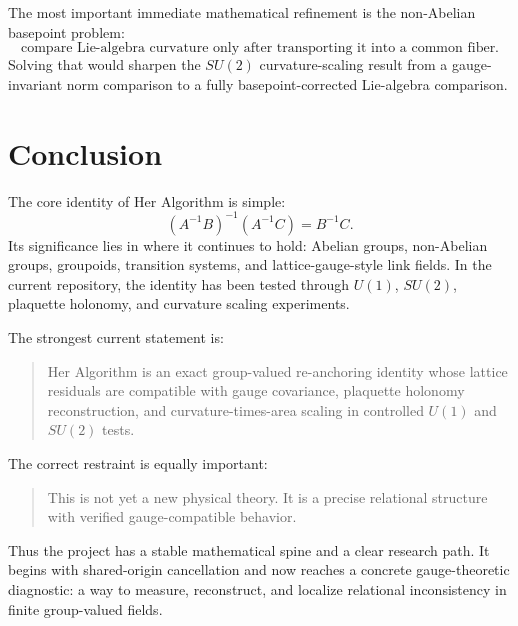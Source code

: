 \documentclass[11pt]{article}
\newcommand{\HA}{Her Algorithm}
\newcommand{\Uone}{U(1)}
\newcommand{\Sutwo}{SU(2)}
\begin{document}
The most important immediate mathematical refinement is the non-Abelian basepoint problem:
\[
\boxed{\text{compare Lie-algebra curvature only after transporting it into a common fiber.}}
\]
Solving that would sharpen the \(\Sutwo\) curvature-scaling result from a gauge-invariant norm comparison to a fully basepoint-corrected Lie-algebra comparison.

\section{Conclusion}

The core identity of \HA{} is simple:
\[
(A^{-1}B)^{-1}(A^{-1}C)=B^{-1}C.
\]
Its significance lies in where it continues to hold: Abelian groups, non-Abelian groups, groupoids, transition systems, and lattice-gauge-style link fields.  In the current repository, the identity has been tested through \(\Uone\), \(\Sutwo\), plaquette holonomy, and curvature scaling experiments.

The strongest current statement is:
\begin{quote}
\HA{} is an exact group-valued re-anchoring identity whose lattice residuals are compatible with gauge covariance, plaquette holonomy reconstruction, and curvature-times-area scaling in controlled \(\Uone\) and \(\Sutwo\) tests.
\end{quote}

The correct restraint is equally important:
\begin{quote}
This is not yet a new physical theory.  It is a precise relational structure with verified gauge-compatible behavior.
\end{quote}

Thus the project has a stable mathematical spine and a clear research path.  It begins with shared-origin cancellation and now reaches a concrete gauge-theoretic diagnostic: a way to measure, reconstruct, and localize relational inconsistency in finite group-valued fields.



\end{document}
